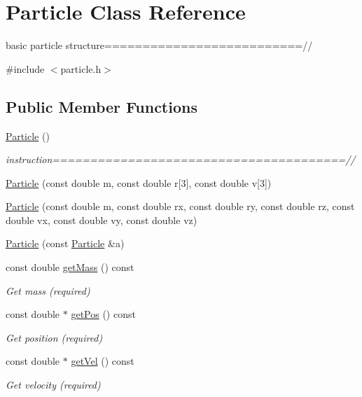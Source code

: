 \hypertarget{classParticle}{}\section{Particle Class Reference}
\label{classParticle}


basic particle structure==========================//  




{\ttfamily \#include $<$particle.\+h$>$}

\subsection*{Public Member Functions}
\begin{DoxyCompactItemize}
\item 
\hyperlink{classParticle_a40f4c7e248029d72e7714b7802d5e5e1}{Particle} ()
\begin{DoxyCompactList}\small\item\em instruction=======================================// \end{DoxyCompactList}\item 
\hyperlink{classParticle_a5200252c69608a5cd6bd7be6ff03ae6c}{Particle} (const double m, const double r\mbox{[}3\mbox{]}, const double v\mbox{[}3\mbox{]})
\item 
\hyperlink{classParticle_ac189ad370eb0a2c05869249d672a4f06}{Particle} (const double m, const double rx, const double ry, const double rz, const double vx, const double vy, const double vz)
\item 
\hyperlink{classParticle_a602b45f0258d4e61d9c07f2c91d4f497}{Particle} (const \hyperlink{classParticle}{Particle} \&a)
\item 
const double \hyperlink{classParticle_a2576aff503f68e78ced91406512b1255}{get\+Mass} () const
\begin{DoxyCompactList}\small\item\em Get mass (required) \end{DoxyCompactList}\item 
const double $\ast$ \hyperlink{classParticle_a4ec76421cddd91b1f27357fb182f6923}{get\+Pos} () const
\begin{DoxyCompactList}\small\item\em Get position (required) \end{DoxyCompactList}\item 
const double $\ast$ \hyperlink{classParticle_ab3d63df7f8c22f232b096ae33b6ea3ac}{get\+Vel} () const
\begin{DoxyCompactList}\small\item\em Get velocity (required) \end{DoxyCompactList}\item 

\end{DoxyCompactItemize}
